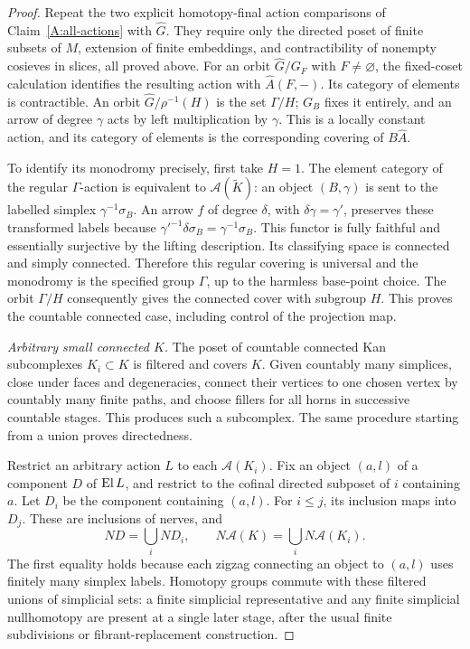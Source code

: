 \begin{proof}
Repeat the two explicit homotopy-final action comparisons of Claim~\ref{A:all-actions} with $\widehat G$. They require only the directed poset of finite subsets of $M$, extension of finite embeddings, and contractibility of nonempty cosieves in slices, all proved above. For an orbit $\widehat G/G_F$ with $F\ne\varnothing$, the fixed-coset calculation identifies the resulting action with $\widehat A(F,-)$. Its category of elements is contractible. An orbit $\widehat G/\rho^{-1}(H)$ is the set $\Gamma/H$; $G_B$ fixes it entirely, and an arrow of degree $\gamma$ acts by left multiplication by $\gamma$. This is a locally constant action, and its category of elements is the corresponding covering of $B\widehat A$.

To identify its monodromy precisely, first take $H=1$. The element category of the regular $\Gamma$-action is equivalent to $\mathcal A(\widetilde K)$: an object $(B,\gamma)$ is sent to the labelled simplex $\gamma^{-1}\sigma_B$. An arrow $f$ of degree $\delta$, with $\delta\gamma=\gamma'$, preserves these transformed labels because
$\gamma'^{-1}\delta\sigma_B=\gamma^{-1}\sigma_B$. This functor is fully faithful and essentially surjective by the lifting description. Its classifying space is connected and simply connected. Therefore this regular covering is universal and the monodromy is the specified group $\Gamma$, up to the harmless base-point choice. The orbit $\Gamma/H$ consequently gives the connected cover with subgroup $H$. This proves the countable connected case, including control of the projection map.

\emph{Arbitrary small connected $K$.}
The poset of countable connected Kan subcomplexes $K_i\subset K$ is filtered and covers $K$. Given countably many simplices, close under faces and degeneracies, connect their vertices to one chosen vertex by countably many finite paths, and choose fillers for all horns in successive countable stages. This produces such a subcomplex. The same procedure starting from a union proves directedness.

Restrict an arbitrary action $L$ to each $\mathcal A(K_i)$. Fix an object $(a,l)$ of a component $D$ of $\operatorname{El} L$, and restrict to the cofinal directed subposet of $i$ containing $a$. Let $D_i$ be the component containing $(a,l)$. For $i\leq j$, its inclusion maps into $D_j$. These are inclusions of nerves, and
\[
 ND=\bigcup_i ND_i,
 \qquad N\mathcal A(K)=\bigcup_iN\mathcal A(K_i).
\]
The first equality holds because each zigzag connecting an object to $(a,l)$ uses finitely many simplex labels. Homotopy groups commute with these filtered unions of simplicial sets: a finite simplicial representative and any finite simplicial nullhomotopy are present at a single later stage, after the usual finite subdivisions or fibrant-replacement construction.


\end{proof}
